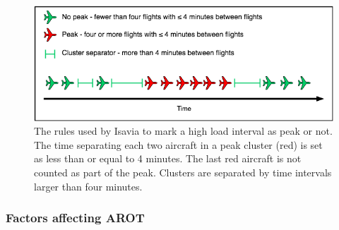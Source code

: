 \begin{figure}
    \centering
    \includegraphics[width=1\textwidth]{graphics/Peak_Diagram.png}
    \caption[Rules defining a peak hour]{The rules used by Isavia to mark a high load interval as peak or not. The time separating each two aircraft in a peak cluster (red) is set as less than or equal to 4 minutes. The last red aircraft is not counted as part of the peak. Clusters are separated by time intervals larger than four minutes.}
    \label{fig:Peak_Diagram}
\end{figure}

\subsubsection{Factors affecting AROT}

\begin{table}[]
\centering
{}
\caption[AROTs for the air traffic mix by RECAT]{AROT statistics for the air traffic mix at KEF by RECAT-EU categories. The count is the number of landings in peak hours since October 2017}
\label{tab:AROT_RECAT_stats}
\end{table}



